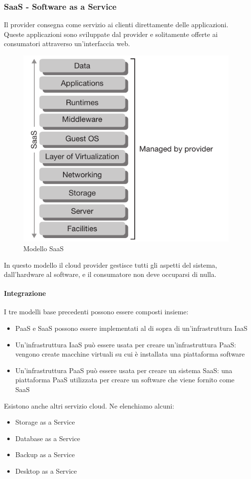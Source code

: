 \documentclass{article}
\begin{document}
\subsubsection{SaaS - Software as a Service}
Il provider consegna come servizio ai clienti direttamente delle applicazioni. Queste applicazioni sono sviluppate dal provider e solitamente offerte ai consumatori attraverso un’interfaccia web.
\begin{figure}[H]
    \centering
    \includegraphics[scale=0.5]{img/saas.png}
    \caption{Modello SaaS}
\end{figure}
\noindent
In questo modello il cloud provider gestisce tutti gli aspetti del sistema, dall’hardware al software, e il consumatore non deve occuparsi di nulla.\\

\paragraph{Integrazione}
I tre modelli base precedenti possono essere composti insieme:
\begin{itemize}
    \item PaaS e SaaS possono essere implementati al di sopra di un’infrastruttura IaaS
    \item Un’infrastruttura IaaS può essere usata per creare un’infrastruttura PaaS: vengono create macchine virtuali su cui è installata una piattaforma software
    \item Un’infrastruttura PaaS può essere usata per creare un sistema SaaS: una piattaforma PaaS utilizzata per creare un software che viene fornito come SaaS
\end{itemize}
Esistono anche altri servizio cloud. Ne elenchiamo alcuni:
\begin{itemize}
    \item Storage as a Service
    \item Database as a Service
    \item Backup as a Service
    \item Desktop as a Service
\end{itemize}
\end{document}
